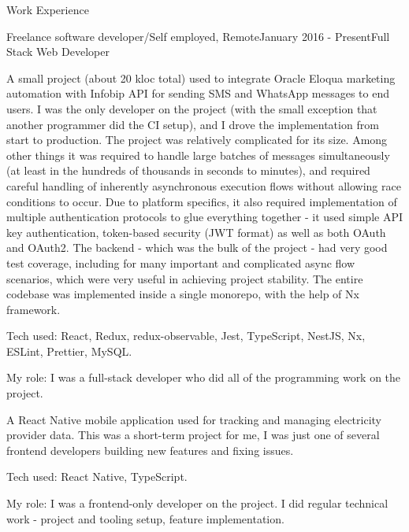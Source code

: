 \documentclass{resume}
\begin{document}
\begin{rSection}{Work Experience}

\begin{rSubsection}{Freelance software developer/Self employed, Remote}{January 2016 - Present}{Full Stack Web Developer}{}

A small project (about 20 kloc total) used to integrate Oracle Eloqua marketing automation with Infobip API for sending SMS and WhatsApp messages to end users. I was the only developer on the project (with the small exception that another programmer did the CI setup), and I drove the implementation from start to production. The project was relatively complicated for its size. Among other things it was required to handle large batches of messages simultaneously (at least in the hundreds of thousands in seconds to minutes), and required careful handling of inherently asynchronous execution flows without allowing race conditions to occur. Due to platform specifics, it also required implementation of multiple authentication protocols to glue everything together - it used simple API key authentication, token-based security (JWT format) as well as both OAuth and OAuth2. The backend - which was the bulk of the project - had very good test coverage, including for many important and complicated async flow scenarios, which were very useful in achieving project stability. The entire codebase was implemented inside a single monorepo, with the help of Nx framework.

\begin{rList}
\item Tech used: React, Redux, redux-observable, Jest, TypeScript, NestJS, Nx, ESLint, Prettier, MySQL.
\item My role: I was a full-stack developer who did all of the programming work on the project.
\end{rList}

A React Native mobile application used for tracking and managing electricity provider data. This was a short-term project for me, I was just one of several frontend developers building new features and fixing issues.

\begin{rList}
\item Tech used: React Native, TypeScript.
\item My role: I was a frontend-only developer on the project. I did regular technical work - project and tooling setup, feature implementation.
\end{rList}


\end{rSubsection}
\end{rSection}
\end{document}
